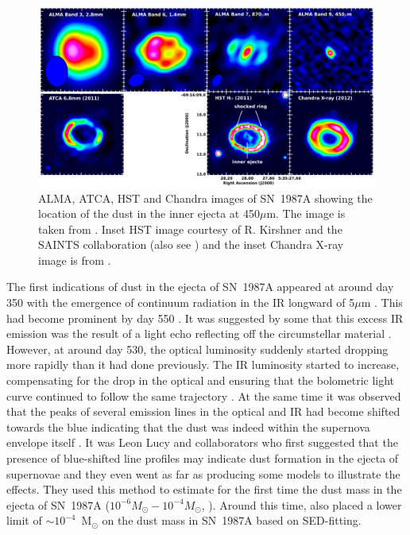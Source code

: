 \begin{figure}
\centering
\includegraphics[clip=true,scale=0.31,trim= 0 0 0 0]{chapters/chapter5/images/ALMA_imgs.png}
\caption{ALMA, ATCA, HST and Chandra images of SN~1987A showing the location of the dust in the inner ejecta at 450$\mu$m.  The image is taken from \citep{Indebetouw2014}.  Inset HST image courtesy of R. Kirshner and the SAINTS collaboration (also see \citet{Larsson2013}) and the inset Chandra X-ray image is from \citet{Helder2013}.}
\label{ALMA}
\end{figure}

The first indications of dust in the ejecta of SN~1987A appeared at around day 350 with the emergence of continuum radiation in the IR longward of 5$\mu$m \citep{Meikle1993}.  This had become prominent by day 550 \citep{Roche1993,Wooden1993}.  It was suggested by some that this excess IR emission was the result of  a light echo reflecting off the circumstellar material \citep{Roche1989}.  However, at around day 530, the optical luminosity suddenly started dropping more rapidly than it had done previously.  The IR luminosity started to increase,  compensating for the drop in the optical and ensuring that the bolometric light curve continued to follow the same trajectory \citep{Suntzeff1991,Whitelock1991}.  At the same time it was observed that the peaks of several emission lines in the optical and IR had become shifted towards the blue indicating that the dust was indeed within the supernova envelope itself \citep{Lucy1989,Danziger1991a,Danziger1991,Meikle1991,Meikle1993,Suntzeff1991,Hanuschik1993}.  It was Leon Lucy and collaborators who first suggested that the presence of blue-shifted line profiles may indicate dust formation in the ejecta of supernovae and they even went as far as producing some models to illustrate the effects.  They used this method  to estimate for the first time the dust mass in the ejecta of SN~1987A ($10^{-6}M_{\odot} - 10^{-4}M_{\odot}$,  \citealt{Lucy1989,Lucy1991}).  Around this time, \citet{Wooden1993} also placed a lower limit of $\sim10^{-4}$~M$_{\odot}$ on the  dust mass in SN~1987A based on SED-fitting.

